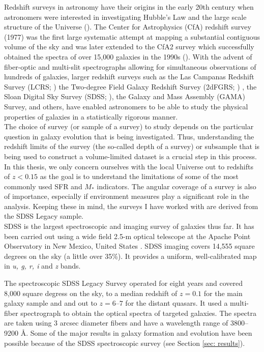 Redshift surveys in astronomy have their origins in the early 20th
century when astronomers were interested in investigating Hubble's Law
and the large scale structure of the Universe
(\citealt{hubble31a}). The Center for Astrophysics (CfA) redshift
survey (1977) was the first large systematic attempt at mapping a
substantial contiguous volume of the sky and was later extended to the
CfA2 survey which successfully obtained the spectra of over 15,000
galaxies in the 1990s (\citealt{huchra95a}). With the advent of
fiber-optic and multi-slit spectrographs allowing for simultaneous
observations of hundreds of galaxies, larger redshift surveys such as
the Las Campanas Redshift Survey (LCRS; \citealt{shectman96a}) the
Two-degree Field Galaxy Redshift Survey (2dFGRS; \citealt{colless01a})
, the Sloan Digital Sky Survey (SDSS; \citealt{2000AJ....120.1579Y,
  eisenstein11a, blanton17a}), the Galaxy and Mass Assembly (GAMA)
Survey, and others, have enabled astronomers to be able to study the
physical properties of galaxies in a statistically rigorous manner.\\

The choice of survey (or sample of a survey) to study depends on the
particular question in galaxy evolution that is being
investigated. Thus, understanding the redshift limits of the survey
(the so-called depth of a survey) or subsample that is being used to
construct a volume-limited dataset is a crucial step in this
process. In this thesis, we only concern ourselves with the local
Universe out to redshifts of $z < 0.15$ as the goal is to understand
the limitations of some of the most commonly used SFR and $M_{*}$
indicators. The angular coverage of a survey is also of importance,
especially if environment measures play a significant role in the
analysis. Keeping these in mind, the surveys I have worked with are
derived from the SDSS Legacy sample.\\

SDSS is the largest spectroscopic and imaging survey of galaxies thus
far. It has been carried out using a wide field 2.5-m optical
telescope at the Apache Point Observatory \citep{2006AJ....131.2332G}
in New Mexico, United States \citep{2000AJ....120.1579Y,
  2002AJ....124.1810S}. SDSS imaging covers 14,555 square degrees on
the sky (a little over 35\%).  It provides a uniform, well-calibrated
map in \emph{u, g, r, i} and \emph{z} bands.

The spectroscopic SDSS Legacy Survey operated for eight years and
covered 8,000 square degress on the sky, to a median redshift of $z=
0.1$ for the main galaxy sample and and out to $z = 6$--$7$ for the
distant quasars.  It used a multi-fiber spectrograph
\citep{smee_multi-object_2013} to obtain the optical spectra of
targeted galaxies. The spectra are taken using 3 arcsec diameter
fibers and have a wavelength range of 3800--9200 \AA. Some of the
major results in galaxy formation and evolution have been possible
because of the SDSS spectroscopic survey (see Section \ref{sec:
  results}).

